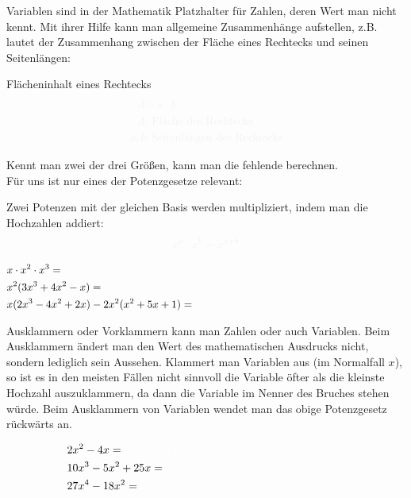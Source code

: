 Variablen sind in der Mathematik Platzhalter für Zahlen, deren Wert man nicht kennt. Mit ihrer Hilfe kann man allgemeine Zusammenhänge aufstellen, z.B. lautet der Zusammenhang zwischen der Fläche eines Rechtecks und seinen Seitenlängen:
\begin{tcolorbox}
	Flächeninhalt eines Rechtecks
	\begin{align*}
		\textcolor{loestc}{A}&\textcolor{loestc}{=a\cdot b}\\
		\textcolor{loestc}{A}&\textcolor{loestc}{: \text{Fläche des Rechtecks}}\\
		\textcolor{loestc}{a, b}&\textcolor{loestc}{: \text{Seitenlängen des Rechtecks}}
	\end{align*}
\end{tcolorbox}
Kennt man zwei der drei Größen, kann man die fehlende berechnen.\\
Für uns ist nur eines der Potenzgesetze relevant:
\begin{tcolorbox}
	Zwei Potenzen mit der gleichen Basis werden multipliziert, indem man die Hochzahlen addiert:
	\begin{align*}
		\textcolor{loestc}{x^a\cdot x^b=x^{a+b}}
	\end{align*}
\end{tcolorbox}
\begin{bsp}
	\begin{align*}
		&x\cdot x^2 \cdot x^3=\textcolor{loes}{x^{1+2}\cdot x^3=x^3\cdot x^3=x^{3+3}=x^6}\\
		&x^2(3x^3+4x^2-x)=\textcolor{loes}{3x^{2+3}+4x^{2+2}-x^{1+2}=3x^5+4x^4-x^3}\\
		&x(2x^3-4x^2+2x)-2x^2(x^2+5x+1)=\textcolor{loes}{2x^4-4x^3+2x^2-2x^4-10x^3-2x^2=-16x^3}
	\end{align*}
\end{bsp}
Ausklammern oder Vorklammern kann man Zahlen oder auch Variablen. Beim Ausklammern ändert man den Wert des mathematischen Ausdrucks nicht, sondern lediglich sein Aussehen. Klammert man Variablen aus (im Normalfall \(x\)), so ist es in den meisten Fällen nicht sinnvoll die Variable öfter als die kleinste Hochzahl auszuklammern, da dann die Variable im Nenner des Bruches stehen würde. Beim Ausklammern von Variablen wendet man das obige Potenzgesetz rückwärts an.
\begin{bsp}
	\begin{align*}
		&2x^2-4x=\textcolor{loes}{x(2x-4)=2x(x-2)}\\
		&10x^3-5x^2+25x=\textcolor{loes}{x(10x^2-5x+25)=5x(2x^2-x+5)}\\
		&27x^4-18x^2=\textcolor{loes}{x^2(27x^2-18)=9x^2(3x^2-2)}
	\end{align*}
\end{bsp}
